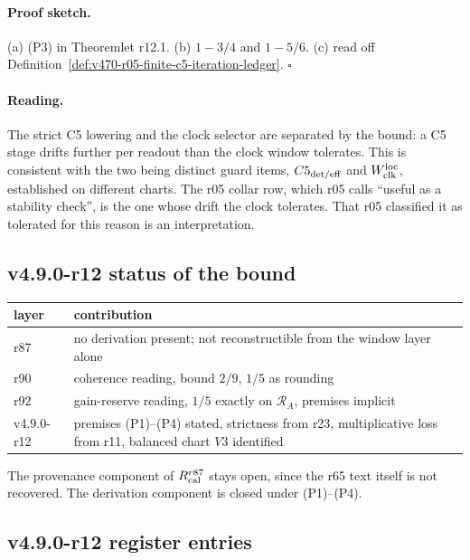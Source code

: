 \paragraph{Proof sketch.}
(a) (P3) in Theoremlet r12.1.  (b) \(1-3/4\) and \(1-5/6\).  (c) read off
Definition~\ref{def:v470-r05-finite-c5-iteration-ledger}.  \(\square\)

\paragraph{Reading.}
The strict C5 lowering and the clock selector are separated by the bound: a C5 stage drifts further per readout than the
clock window tolerates.  This is consistent with the two being distinct guard items, \(C5_{\rm det/eff}\) and
\(W_{\rm clk}^{\rm loc}\), established on different charts.  The r05 collar row, which r05 calls ``useful as a stability
check'', is the one whose drift the clock tolerates.  That r05 classified it as tolerated for this reason is an
interpretation.

\subsection*{v4.9.0-r12 status of the bound}
\label{subsec:v490-r12-status}

\begin{center}
\small
\begin{tabular}{@{}>{\raggedright\arraybackslash}p{}>{\raggedright\arraybackslash}p{}@{}}
\toprule
layer & contribution\\
\midrule
r87 & no derivation present; not reconstructible from the window layer alone\\
r90 & coherence reading, bound \(2/9\), \(1/5\) as rounding\\
r92 & gain-reserve reading, \(1/5\) exactly on \(\mathcal R_A\), premises implicit\\
v4.9.0-r12 & premises (P1)--(P4) stated, strictness from r23, multiplicative loss from r11, balanced chart \(V3\) identified\\
\bottomrule
\end{tabular}
\end{center}
The provenance component of \(R_{\rm cal}^{r87}\) stays open, since the r65 text itself is not recovered.  The derivation
component is closed under (P1)--(P4).

\subsection*{v4.9.0-r12 register entries}
\label{subsec:v490-r12-register}

